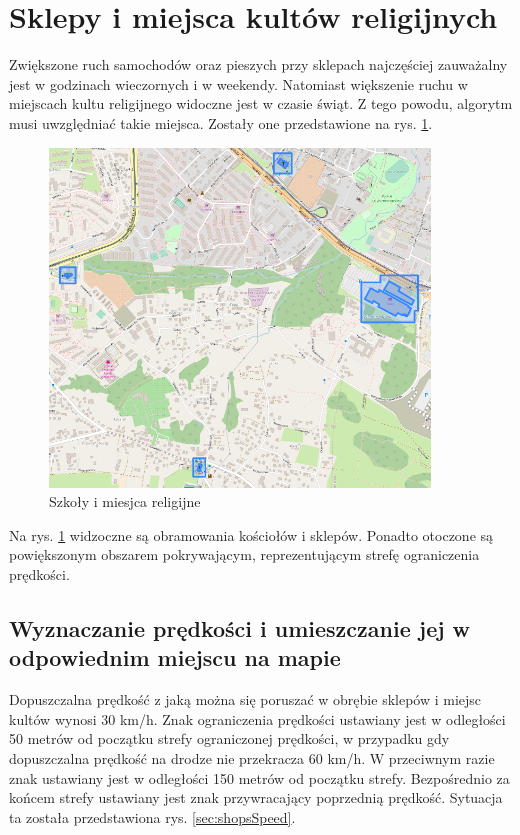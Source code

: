 \newpage
\section{Sklepy i miejsca kultów religijnych}
\label{sec:shoopsChurchesMain}

Zwiększone ruch samochodów oraz pieszych przy sklepach najczęściej zauważalny jest w godzinach wieczornych i w weekendy. Natomiast większenie ruchu w miejscach kultu religijnego widoczne jest w czasie świąt. Z tego powodu, algorytm musi uwzględniać takie miejsca. Zostały one przedstawione na rys. \ref{sec:shopsBorder}.

\begin{figure}[h]
\caption{Szkoły i miesjca religijne}
\label{sec:shopsBorder}
\centering
\includegraphics[width=0.9\textwidth]{shopsBorder}
\end{figure}

Na rys. \ref{sec:shopsBorder} widzoczne są obramowania kościołów i sklepów. Ponadto otoczone są powiększonym obszarem pokrywającym, reprezentującym strefę ograniczenia prędkości.

\newpage
\subsection{Wyznaczanie prędkości i umieszczanie jej w odpowiednim miejscu na mapie}

Dopuszczalna prędkość z jaką można się poruszać w obrębie sklepów i miejsc kultów wynosi 30 km/h. Znak ograniczenia prędkości ustawiany jest w odległości 50 metrów od początku strefy ograniczonej prędkości, w przypadku gdy dopuszczalna prędkość na drodze nie przekracza 60 km/h. W przeciwnym razie znak ustawiany jest w odległości 150 metrów od początku strefy. Bezpośrednio za końcem strefy ustawiany jest znak przywracający poprzednią prędkość. Sytuacja ta została przedstawiona rys. \ref{sec:shopsSpeed}.

